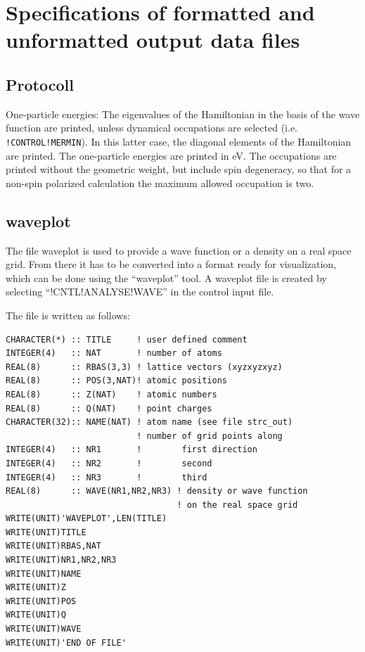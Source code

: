 \documentclass[final,12pt]{article}
\begin{document}
{{{{{{%
\newpage
\section{Specifications of formatted and unformatted output data files}
\subsection{Protocoll}
One-particle energies: The eigenvalues of the Hamiltonian in the basis
of the wave function are printed, unless dynamical occupations are
selected (i.e. \texttt{!CONTROL!MERMIN}). In this latter case, the
diagonal elements of the Hamiltonian are printed. The one-particle
energies are printed in eV. The occupations are printed without the
geometric weight, but include spin degeneracy, so that for a non-spin
polarized calculation the maximum allowed occupation is two.



\subsection{waveplot}
The file waveplot is used to provide a wave function or a density on
a real space grid. From there it has to be converted into a format
ready for visualization, which can be done using the ``waveplot'' tool.
A waveplot file is created by selecting ``!CNTL!ANALYSE!WAVE'' in the
control input file.


The file is written as follows:
\small{
\begin{verbatim}
CHARACTER(*) :: TITLE     ! user defined comment
INTEGER(4)   :: NAT       ! number of atoms
REAL(8)      :: RBAS(3,3) ! lattice vectors (xyzxyzxyz)
REAL(8)      :: POS(3,NAT)! atomic positions
REAL(8)      :: Z(NAT)    ! atomic numbers 
REAL(8)      :: Q(NAT)    ! point charges
CHARACTER(32):: NAME(NAT) ! atom name (see file strc_out)
                          ! number of grid points along 
INTEGER(4)   :: NR1       !        first direction
INTEGER(4)   :: NR2       !        second
INTEGER(4)   :: NR3       !        third
REAL(8)      :: WAVE(NR1,NR2,NR3) ! density or wave function 
                                  ! on the real space grid
WRITE(UNIT)'WAVEPLOT',LEN(TITLE)
WRITE(UNIT)TITLE
WRITE(UNIT)RBAS,NAT
WRITE(UNIT)NR1,NR2,NR3
WRITE(UNIT)NAME
WRITE(UNIT)Z
WRITE(UNIT)POS
WRITE(UNIT)Q
WRITE(UNIT)WAVE
WRITE(UNIT)'END OF FILE'
\end{verbatim}
}

}}}}}}
\end{document}
